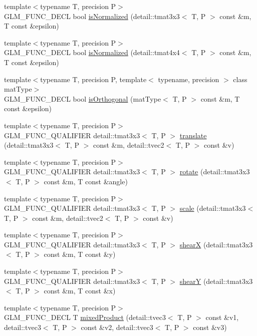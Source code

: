 \begin{CompactItemize}
\item 
{\footnotesize template$<$typename T, precision P$>$ }\\GLM\_\-FUNC\_\-DECL bool \hyperlink{group__gtx__matrix__query_g31396988209969ac17b2764cff154c36}{isNormalized} (detail::tmat3x3$<$ T, P $>$ const \&m, T const \&epsilon)
\item 
{\footnotesize template$<$typename T, precision P$>$ }\\GLM\_\-FUNC\_\-DECL bool \hyperlink{group__gtx__matrix__query_g0005612df8bcf46d6dda35d373a61fbb}{isNormalized} (detail::tmat4x4$<$ T, P $>$ const \&m, T const \&epsilon)
\item 
{\footnotesize template$<$typename T, precision P, template$<$ typename, precision $>$ class matType$>$ }\\GLM\_\-FUNC\_\-DECL bool \hyperlink{group__gtx__matrix__query_gbaeee016acd42f7a58bd1de063a3061b}{isOrthogonal} (matType$<$ T, P $>$ const \&m, T const \&epsilon)
\item 
{\footnotesize template$<$typename T, precision P$>$ }\\GLM\_\-FUNC\_\-QUALIFIER detail::tmat3x3$<$ T, P $>$ \hyperlink{group__gtx__matrix__transform__2d_g307934204fead7ff8ec86bd4499c0adc}{translate} (detail::tmat3x3$<$ T, P $>$ const \&m, detail::tvec2$<$ T, P $>$ const \&v)
\item 
{\footnotesize template$<$typename T, precision P$>$ }\\GLM\_\-FUNC\_\-QUALIFIER detail::tmat3x3$<$ T, P $>$ \hyperlink{group__gtx__matrix__transform__2d_gcfd972a1747f367837d62e00be5d841e}{rotate} (detail::tmat3x3$<$ T, P $>$ const \&m, T const \&angle)
\item 
{\footnotesize template$<$typename T, precision P$>$ }\\GLM\_\-FUNC\_\-QUALIFIER detail::tmat3x3$<$ T, P $>$ \hyperlink{group__gtx__matrix__transform__2d_g275b188a11797f386aeda153a17afcdc}{scale} (detail::tmat3x3$<$ T, P $>$ const \&m, detail::tvec2$<$ T, P $>$ const \&v)
\item 
{\footnotesize template$<$typename T, precision P$>$ }\\GLM\_\-FUNC\_\-QUALIFIER detail::tmat3x3$<$ T, P $>$ \hyperlink{group__gtx__matrix__transform__2d_g921a7ae4b10ba6cc7422be200cf3afd5}{shearX} (detail::tmat3x3$<$ T, P $>$ const \&m, T const \&y)
\item 
{\footnotesize template$<$typename T, precision P$>$ }\\GLM\_\-FUNC\_\-QUALIFIER detail::tmat3x3$<$ T, P $>$ \hyperlink{group__gtx__matrix__transform__2d_g5f6d0ef99f6be6ff1151ca174261004d}{shearY} (detail::tmat3x3$<$ T, P $>$ const \&m, T const \&x)
\item 
\hypertarget{group__gtx__mixed__product_g996c1d98418ba8e1208e273404158883}{
{\footnotesize template$<$typename T, precision P$>$ }\\GLM\_\-FUNC\_\-DECL T \hyperlink{group__gtx__mixed__product_g996c1d98418ba8e1208e273404158883}{mixedProduct} (detail::tvec3$<$ T, P $>$ const \&v1, detail::tvec3$<$ T, P $>$ const \&v2, detail::tvec3$<$ T, P $>$ const \&v3)}
\label{group__gtx__mixed__product_g996c1d98418ba8e1208e273404158883}


\end{CompactItemize}
